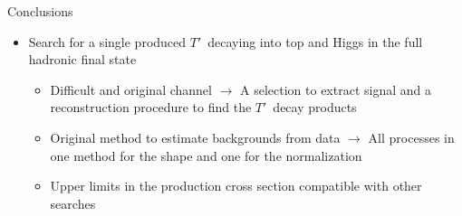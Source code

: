 \documentclass[usenames,dvipsnames]{beamer}
\newcommand{\Tp}{$T'$}
\begin{document}
\begin{frame}{Conclusions}
\begin{block}{}
\begin{itemize}
\begin{itemize}
    \end{itemize}
  \item Search for a single produced \Tp~decaying into top and Higgs in the full hadronic final state
    \begin{itemize}\scriptsize
    \item Difficult and original channel $\to$ A selection to extract signal and a reconstruction procedure to find the \Tp~decay products
    \item Original method to estimate backgrounds from data $\to$ All processes in one method for the shape and one for the normalization
    \item Upper limits in the production cross section compatible with other searches
    \end{itemize}
\end{itemize}
\end{block}
\end{frame}
\end{document}
